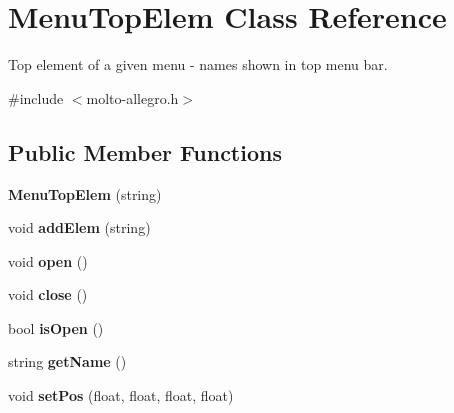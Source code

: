 \hypertarget{classMenuTopElem}{\section{Menu\-Top\-Elem Class Reference}
\label{classMenuTopElem}
}


Top element of a given menu -\/ names shown in top menu bar.  




{\ttfamily \#include $<$molto-\/allegro.\-h$>$}

\subsection*{Public Member Functions}
\begin{DoxyCompactItemize}
\item 
\hypertarget{classMenuTopElem_aa81ce746279ce1dbeea41a427f8c1e11}{{\bfseries Menu\-Top\-Elem} (string)}\label{classMenuTopElem_aa81ce746279ce1dbeea41a427f8c1e11}

\item 
\hypertarget{classMenuTopElem_a2f2cdb6e30969971782931b4ef6bf357}{void {\bfseries add\-Elem} (string)}\label{classMenuTopElem_a2f2cdb6e30969971782931b4ef6bf357}

\item 
\hypertarget{classMenuTopElem_aae4b2df96d91f3e38c64d75b5bd8c1e0}{void {\bfseries open} ()}\label{classMenuTopElem_aae4b2df96d91f3e38c64d75b5bd8c1e0}

\item 
\hypertarget{classMenuTopElem_a18d512946f680d3ef5d4a4c8467b7bbe}{void {\bfseries close} ()}\label{classMenuTopElem_a18d512946f680d3ef5d4a4c8467b7bbe}

\item 
\hypertarget{classMenuTopElem_a4bad4b96d14a3542f9d744bc9e6cdfe3}{bool {\bfseries is\-Open} ()}\label{classMenuTopElem_a4bad4b96d14a3542f9d744bc9e6cdfe3}

\item 
\hypertarget{classMenuTopElem_a41023b203dfa45c7fa43b6f02f845170}{string {\bfseries get\-Name} ()}\label{classMenuTopElem_a41023b203dfa45c7fa43b6f02f845170}

\item 
\hypertarget{classMenuTopElem_a5e0f820addb5ab86ac65a8d6efbdf19d}{void {\bfseries set\-Pos} (float, float, float, float)}\label{classMenuTopElem_a5e0f820addb5ab86ac65a8d6efbdf19d}

\end{DoxyCompactItemize}


